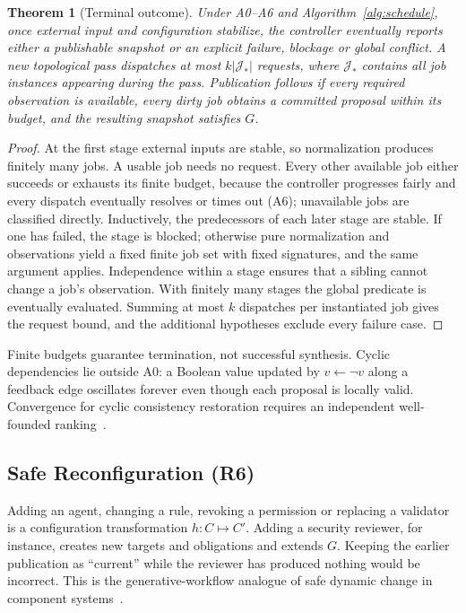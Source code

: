 \documentclass[10pt,journal,compsoc]{IEEEtran}
\theoremstyle{plain}
\newtheorem{theorem}{Theorem}
\theoremstyle{definition}
\newcommand{\Jobs}{\mathcal J}
\begin{document}
\begin{theorem}[Terminal outcome]\label{thm:termination}
Under A0--A6 and Algorithm~\ref{alg:schedule}, once external input and configuration stabilize, the controller eventually reports either a publishable snapshot or an explicit failure, blockage or global conflict. A new topological pass dispatches at most $k|\Jobs_*|$ requests, where $\Jobs_*$ contains all job instances appearing during the pass. Publication follows if every required observation is available, every dirty job obtains a committed proposal within its budget, and the resulting snapshot satisfies $G$.
\end{theorem}
\begin{proof}
At the first stage external inputs are stable, so normalization produces finitely many jobs. A usable job needs no request. Every other available job either succeeds or exhausts its finite budget, because the controller progresses fairly and every dispatch eventually resolves or times out (A6); unavailable jobs are classified directly. Inductively, the predecessors of each later stage are stable. If one has failed, the stage is blocked; otherwise pure normalization and observations yield a fixed finite job set with fixed signatures, and the same argument applies. Independence within a stage ensures that a sibling cannot change a job's observation. With finitely many stages the global predicate is eventually evaluated. Summing at most $k$ dispatches per instantiated job gives the request bound, and the additional hypotheses exclude every failure case.
\end{proof}

Finite budgets guarantee termination, not successful synthesis. Cyclic dependencies lie outside A0: a Boolean value updated by $v\gets\neg v$ along a feedback edge oscillates forever even though each proposal is locally valid. Convergence for cyclic consistency restoration requires an independent well-founded ranking~\cite{klare,stevens}.

\subsection{Safe Reconfiguration (R6)}
Adding an agent, changing a rule, revoking a permission or replacing a validator is a configuration transformation $h:C\mapsto C'$. Adding a security reviewer, for instance, creates new targets and obligations and extends $G$. Keeping the earlier publication as ``current'' while the reviewer has produced nothing would be incorrect. This is the generative-workflow analogue of safe dynamic change in component systems~\cite{kramer1990evolving,vandewoude2007tranquility}.
\end{document}
